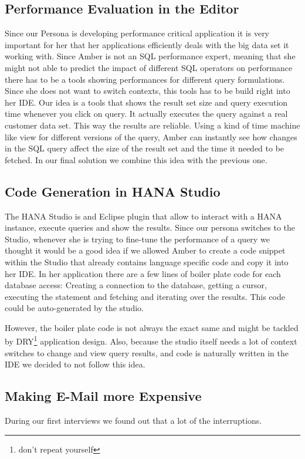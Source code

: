 \subsection{Performance Evaluation in the Editor}
Since our Persona is developing performance critical application it is very important for her that her applications efficiently deals with the big data set it working with. Since Amber is not an SQL performance expert, meaning that she might not able to predict the impact of different SQL operators on performance there has to be a tools showing performances for different query formulations. Since she does not want to switch contexts, this tools has to be build right into her IDE. Our idea is a tools that shows the result set size and query execution time whenever you click on query. It actually executes the query against a real customer data set. This way the results are reliable.
Using a kind of time machine like view for different versions of the query, Amber can instantly see how changes in the SQL query affect the size of the result set and the time it needed to be fetched.
In our final solution we combine this idea with the previous one.

\subsection{Code Generation in HANA Studio}
The HANA Studio is and Eclipse plugin that allow to interact with a HANA instance, execute queries and show the results. Since our persona switches to the Studio, whenever she is trying to fine-tune the performance of a query we thought it would be a good idea if we allowed Amber to create a code snippet within the Studio that already contains language specific code and copy it into her IDE. In her application there are a few lines of boiler plate code for each database access: Creating a connection to the database, getting a cursor, executing the statement and fetching and iterating over the results. This code could be auto-generated by the studio.

However, the boiler plate code is not always the exact same and might be tackled by DRY\footnote{don't repeat yourself} application design.
Also, because the studio itself needs a lot of context switches to change and view query results, and code is naturally written in the IDE we decided to not follow this idea. 

\subsection{Making E-Mail more Expensive}
During our first interviews we found out that a lot of the interruptions. 

